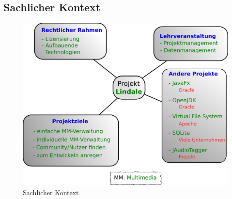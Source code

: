 \subsection{Sachlicher Kontext}
\begin{figure}[!ht]
\center
\includegraphics[width=\linewidth]{images/sachlicher-kontext}
\caption{Sachlicher Kontext}
\end{figure}